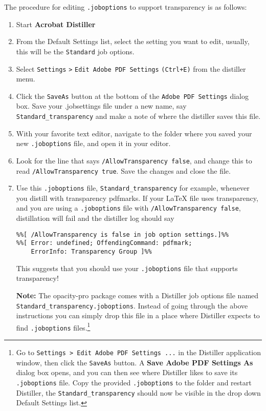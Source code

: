 \documentclass{article}
\let\pkg\textsf
\let\app\textsf
\begin{document}
The procedure for editing \texttt{.joboptions} to support transparency is as follows:
\begin{enumerate}
    \item Start \textbf{Acrobat Distiller}
    \item From the Default Settings list, select the setting you want to edit,
    usually, this will be the \texttt{Standard} job options.
    \item Select \texttt{Settings} \texttt{>} \texttt{Edit Adobe PDF Settings} \texttt{(Ctrl+E)} from the
    distiller menu.
    \item Click the \texttt{SaveAs} button at the bottom of the \texttt{Adobe PDF Settings}
    dialog box. Save your .jobsettings file under a new name,
    say \texttt{Standard\_transparency} and make a note of where
    the distiller saves this file.
    \item With your favorite text editor, navigate to the folder where you saved your new
    \texttt{.job\-options} file, and open it in your editor.
    \item Look for the line that says
    \texttt{/AllowTransparency false}, and change this to read \texttt{/AllowTransparency true}.
    Save the changes and close the file.
    \item Use this \texttt{.joboptions} file, \texttt{Standard\_transparency} for example,
    whenever you distill with transparency pdfmarks.  If your {\LaTeX} file uses transparency,
    and you are using a \texttt{.joboptions} file with \texttt{/AllowTransparency false}, distillation
    will fail and the distiller log should say
\begin{Verbatim}[fontsize=\small]
%%[Error: The PostScript contains Transparency pdfmark, job aborted.]%%
%%[ /AllowTransparency is false in job option settings.]%%
%%[ Error: undefined; OffendingCommand: pdfmark;
    ErrorInfo: Transparency Group ]%%
\end{Verbatim}
This suggests that you should use your \texttt{.joboptions} file that supports transparency!

\newtopic \textbf{Note:} The \pkg{opacity-pro} package comes with a \app{Distiller} job options file named
\texttt{Standard\_transparency.joboptions}. Instead of going through the
above instructions you can simply drop this file in a
place where Distiller expects to find \texttt{.joboptions}
files.\footnote{Go to \texttt{Settings > Edit Adobe PDF Settings ...} in
the Distiller application window, then click the \texttt{SaveAs} button. A
\textbf{Save Adobe PDF Settings As} dialog box opens, and you can then see
where Distiller likes to save its \texttt{.joboptions} file. Copy the
provided \texttt{.joboptions} to the folder and restart Distiller, the
\texttt{Standard\_transparency} should now be visible in the drop down
\textsf{Default Settings} list.}

\end{enumerate}
\end{document}
